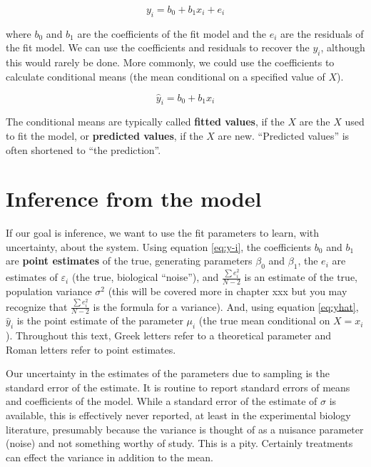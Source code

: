 \documentclass[]{book}
\begin{document}
\begin{equation}
y_i = b_0 + b_1 x_i + e_i
\label{eq:y-i}
\end{equation}

where \(b_0\) and \(b_1\) are the coefficients of the fit model and the \(e_i\) are the residuals of the fit model. We can use the coefficients and residuals to recover the \(y_i\), although this would rarely be done. More commonly, we could use the coefficients to calculate conditional means (the mean conditional on a specified value of \(X\)).

\begin{equation}
\hat{y}_i = b_0 + b_1 x_i
\label{eq:yhat}
\end{equation}

The conditional means are typically called \textbf{fitted values}, if the \(X\) are the \(X\) used to fit the model, or \textbf{predicted values}, if the \(X\) are new. ``Predicted values'' is often shortened to ``the prediction''.

\hypertarget{inference-from-the-model}{%
\section{Inference from the model}\label{inference-from-the-model}}

If our goal is inference, we want to use the fit parameters to learn, with uncertainty, about the system. Using equation \eqref{eq:y-i}, the coefficients \(b_0\) and \(b_1\) are \textbf{point estimates} of the true, generating parameters \(\beta_0\) and \(\beta_1\), the \(e_i\) are estimates of \(\varepsilon_i\) (the true, biological ``noise''), and \(\frac{\sum{e_i^2}}{N-2}\) is an estimate of the true, population variance \(\sigma^2\) (this will be covered more in chapter xxx but you may recognize that \(\frac{\sum{e_i^2}}{N-2}\) is the formula for a variance). And, using equation \eqref{eq:yhat}, \(\hat{y}_i\) is the point estimate of the parameter \(\mu_i\) (the true mean conditional on \(X=x_i\)). Throughout this text, Greek letters refer to a theoretical parameter and Roman letters refer to point estimates.

Our uncertainty in the estimates of the parameters due to sampling is the standard error of the estimate. It is routine to report standard errors of means and coefficients of the model. While a standard error of the estimate of \(\sigma\) is available, this is effectively never reported, at least in the experimental biology literature, presumably because the variance is thought of as a nuisance parameter (noise) and not something worthy of study. This is a pity. Certainly treatments can effect the variance in addition to the mean.
\end{document}
